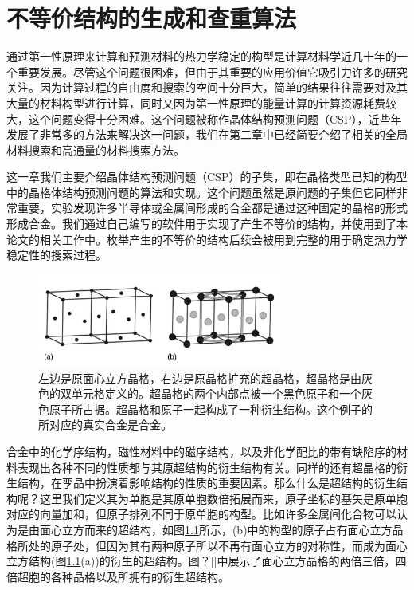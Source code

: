 \chapter{不等价结构的生成和查重算法}
通过第一性原理来计算和预测材料的热力学稳定的构型是计算材料学近几十年的一个重要发展。尽管这个问题很困难，但由于其重要的应用价值它吸引力许多的研究关注。因为计算过程的自由度和搜索的空间十分巨大，简单的结果往往需要对及其大量的材料构型进行计算，同时又因为第一性原理的能量计算的计算资源耗费较大，这个问题变得十分困难。这个问题被称作晶体结构预测问题（CSP），近些年发展了非常多的方法来解决这一问题，我们在第二章中已经简要介绍了相关的全局材料搜索和高通量的材料搜索方法。

这一章我们主要介绍晶体结构预测问题（CSP）的子集，即在晶格类型已知的构型中的晶格体结构预测问题的算法和实现。这个问题虽然是原问题的子集但它同样非常重要，实验发现许多半导体或金属间形成的合金都是通过这种固定的晶格的形式形成合金。我们通过自己编写的软件用于实现了产生不等价的结构，并使用到了本论文的相关工作中。枚举产生的不等价的结构后续会被用到完整的用于确定热力学稳定性的搜索过程。

\begin{figure}
  \includegraphics[width=0.72\textwidth]{figs/ch4_fcc_superlattice.png}
  \centering
  \caption{左边是原面心立方晶格，右边是原晶格扩充的超晶格，超晶格是由灰色的双单元格定义的。超晶格的两个内部点被一个黑色原子和一个灰色原子所占据。超晶格和原子一起构成了一种衍生结构。这个例子的所对应的真实合金是合金。}
  \label{fig:ch4_fcc_superlattice}
\end{figure}

合金中的化学序结构，磁性材料中的磁序结构，以及非化学配比的带有缺陷序的材料表现出各种不同的性质都与其原超结构的衍生结构\cite{buerger1947derivative,santoro1973coincidence,santoro1972properties}有关。同样的还有超晶格的衍生结构，在孪晶中扮演着影响结构的性质的重要因素。那么什么是超结构的衍生结构呢？这里我们定义其为单胞是其原单胞数倍拓展而来，原子坐标的基矢是原单胞对应的向量加和，但原子排列不同于原单胞的构型。比如许多金属间化合物可以认为是由面心立方而来的超结构，如图\ref{fig:ch4_fcc_superlattice}所示，(b)中的构型的原子占有面心立方晶格所处的原子处，但因为其有两种原子所以不再有面心立方的对称性，而成为面心立方结构(图\ref{fig:ch4_fcc_superlattice}(a))的衍生的超结构。图？[]中展示了面心立方晶格的两倍三倍，四倍超胞的各种晶格以及所拥有的衍生超结构。

